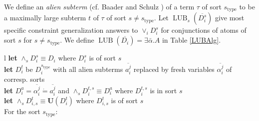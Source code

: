 \documentclass{article}
\newcommand{\assign}{:=}
\newcommand{\tmem}[1]{{\em #1\/}}
\newcommand{\tmmathbf}[1]{\ensuremath{\boldsymbol{#1}}}
\newcommand{\tmop}[1]{\ensuremath{\operatorname{#1}}}
\newcommand{\tmstrong}[1]{\textbf{#1}}
\begin{document}
We define an {\tmem{alien subterm}} (cf. Baader and Schulz
{\cite{UnificationBaader}}) of a term $\tau$ of sort $s_{\tmop{type}}$ to be a
maximally large subterm $t$ of $\tau$ of sort $s \neq s_{\tmop{type}}$. Let
$\tmop{LUB}_s (\overline{D_i^s})$ give most specific constraint generalization
answers to $\vee_i D_i^s$ for conjunctions of atoms of sort $s$ for $s \neq
s_{\tmop{type}}$. We define $\tmop{LUB} (\overline{D_i}) = \exists
\bar{\alpha} .A$ in Table \ref{LUBAlg}.\begin{table}[t]
  \begin{tabular}{l}
    {\tmstrong{let}} $\wedge_s D_i^s \equiv D_i$ where $D_i^s$ is of sort
    $s$\\
    {\tmstrong{let}} $D_i^t$ be $D_i^{s_{\tmop{type}}}$ with all alien
    subterms $\overline{a^j_i}$ replaced by fresh variables
    $\overline{\alpha^j_i}$ of corresp. sorts\\
    {\tmstrong{let}} $D^a_i = \overline{\alpha^j_i} \dot{=} \overline{a^j_i}$
    and $\wedge_s D_i^{t, s} \equiv D_i^a$ where $D_i^{t, s}$ is in sort $s$\\
    {\tmstrong{let}} $\wedge_s D^t_{i, s} \equiv \tmmathbf{U} (D^t_i)$ where
    $D^t_{i, s}$ is of sort $s$\\
    For the sort $s_{\tmop{type}}$:\\
    \ 
\end{tabular}
\end{table}
\end{document}
